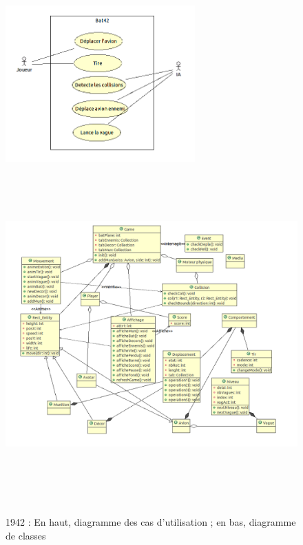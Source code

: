 \begin{figure}[h]
 \centering
 \includegraphics[height=6cm]{../umls/UML_images/Bat42/utilisation} \hfill
 \includegraphics[height=13cm]{../umls/UML_images/Bat42/class} \hfill
 \caption{1942 : En haut, diagramme des cas d'utilisation  ; en bas, diagramme de classes}
\end{figure}

